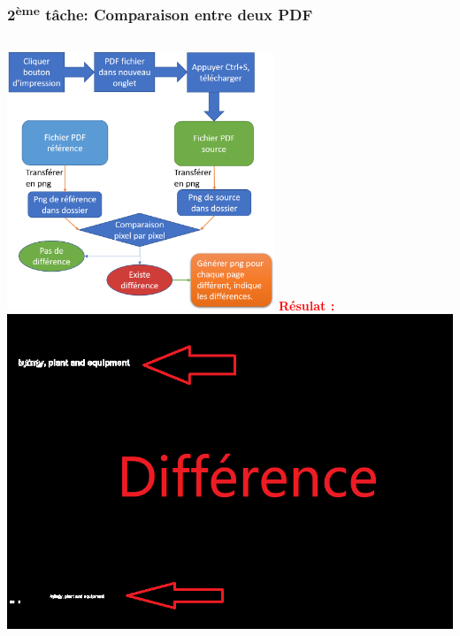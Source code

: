 \documentclass{beamer}
\begin{document}
        \begin{frame}
            \frametitle{2\textsuperscript{ème} tâche: Comparaison entre deux PDF}
            \begin{columns}
            \includegraphics[width=8cm]{process_compar_pdf.png}
            \textcolor{red}{\textbf{Résulat : \newline \newline}}
            \includegraphics[width=\textwidth]{png_difference.png}
            \end{columns}
        \end{frame}
        
\end{document}
